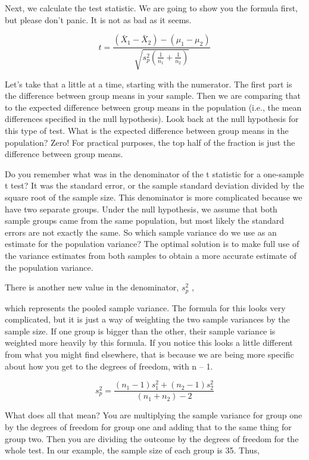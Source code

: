 \documentclass[
  letterpaper,
  DIV=11,
  numbers=noendperiod]{scrreprt}
\begin{document}
Next, we calculate the test statistic. We are going to show you the
formula first, but please don't panic. It is not as bad as it seems.

\[
t = \frac{(\bar{X}_1-\bar{X}_2)-(\mu_1-\mu_2)}{\sqrt{s_p^2(\frac{1}{n_1}+\frac{1}{n_2})}}
\]

Let's take that a little at a time, starting with the numerator. The
first part is the difference between group means in your sample. Then we
are comparing that to the expected difference between group means in the
population (i.e., the mean differences specified in the null
hypothesis). Look back at the null hypothesis for this type of test.
What is the expected difference between group means in the population?
Zero! For practical purposes, the top half of the fraction is just the
difference between group means.

Do you remember what was in the denominator of the t statistic for a
one-sample t test? It was the standard error, or the sample standard
deviation divided by the square root of the sample size. This
denominator is more complicated because we have two separate groups.
Under the null hypothesis, we assume that both sample groups came from
the same population, but most likely the standard errors are not exactly
the same. So which sample variance do we use as an estimate for the
population variance? The optimal solution is to make full use of the
variance estimates from both samples to obtain a more accurate estimate
of the population variance.

There is another new value in the denominator, \(s_p^2\) ,

which represents the pooled sample variance. The formula for this looks
very complicated, but it is just a way of weighting the two sample
variances by the sample size. If one group is bigger than the other,
their sample variance is weighted more heavily by this formula. If you
notice this looks a little different from what you might find elsewhere,
that is because we are being more specific about how you get to the
degrees of freedom, with n -- 1.

\[
s_p^2 = \frac{(n_1 − 1)s_1^2 + (n_2 − 1)s_2^2}{(n_1+ n_2)−2}
\]

What does all that mean? You are multiplying the sample variance for
group one by the degrees of freedom for group one and adding that to the
same thing for group two. Then you are dividing the outcome by the
degrees of freedom for the whole test. In our example, the sample size
of each group is 35. Thus,
\end{document}
